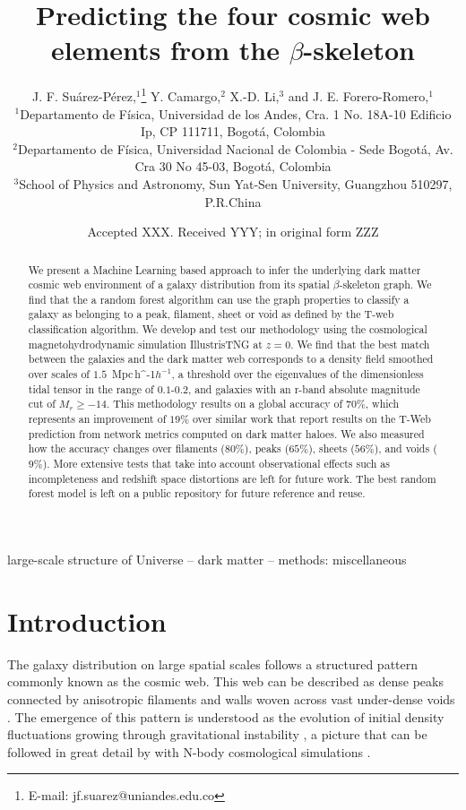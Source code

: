 \documentclass[usenatbib]{mnras}
\title[Cosmic web elements and the $\beta$-skeleton]{Predicting the four cosmic web
  elements from the $\beta$-skeleton}
\author[J. F. Su\'arez-P\'erez et al.]{
J. F. Su\'arez-P\'erez,$^{1}$\thanks{E-mail: jf.suarez@uniandes.edu.co}
Y. Camargo,$^{2}$ 
X.-D. Li,$^{3}$
and J. E. Forero-Romero,$^{1}$
\\
$^{1}$Departamento de F\'isica, Universidad de los Andes, Cra. 1
No. 18A-10 Edificio Ip, CP 111711, Bogot\'a, Colombia\\ 
$^{2}$Departamento de F\'isica, Universidad Nacional de Colombia -
Sede Bogot\'a, Av. Cra 30 No 45-03, Bogot\'a, Colombia\\ 
$^{3}$School of Physics and Astronomy, Sun Yat-Sen University,
Guangzhou 510297, P.R.China\\ 
}
\date{Accepted XXX. Received YYY; in original form ZZZ}
\newcommand{\Mpch}{\,{\rm Mpc}\,\ifmmode h^{-1}\else $h^{-1}$\fi}
\begin{document}
\label{firstpage}
\pagerange{\pageref{firstpage}--\pageref{lastpage}}
\maketitle

\begin{abstract}
We present a Machine Learning based approach to infer the underlying dark matter cosmic web environment of a galaxy distribution from its spatial $\beta$-skeleton graph.
We find that the a random forest algorithm can use the graph properties to classify a galaxy as belonging to a peak, filament, sheet or void as defined by the T-web classification algorithm.
We develop and test our methodology using the cosmological magnetohydrodynamic simulation IllustrisTNG at $z=0$.
We find that the best match between the galaxies and the dark matter web corresponds to a density field smoothed over scales of $1.5$ \Mpch, a threshold over the eigenvalues of the dimensionless tidal tensor in the range of $0.1$-$0.2$, and galaxies with an r-band absolute magnitude cut of $M_r\geq-14$.
This methodology results on a global accuracy of $70\%$, which represents an improvement of $19\%$ over similar work that report results on the T-Web prediction from network metrics computed on dark matter haloes.
We also measured how the accuracy changes over filaments ($80\%$), peaks ($65\%$), sheets ($56\%$), and voids ($9\%$).
More extensive tests that take into account observational effects such as incompleteness and redshift space distortions are left for future work.
The best random forest model is left on a public repository for future reference and reuse. 
\end{abstract}

\begin{keywords}
large-scale structure of Universe -- dark matter -- methods: miscellaneous
\end{keywords}


\section{Introduction}
The galaxy distribution on large spatial scales follows a structured 
pattern commonly known as the cosmic web. 
This web can be described as dense peaks connected by anisotropic
filaments and walls woven across vast under-dense voids 
\citep{Bond1996}.  
The emergence of this pattern is understood as the evolution of
initial density fluctuations growing through gravitational instability
\citep{ZelDovich1970,White1987}, a picture that can be followed in
great detail by with N-body cosmological simulations
\citep{Schmalzing1999,Vogelsberger2014}.     
\end{document}
